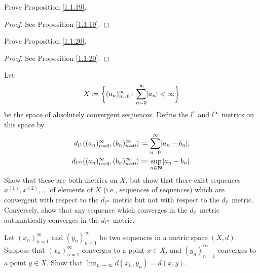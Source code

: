 \begin{exercise}\label{ex 1.1.13}
    Prove Proposition \ref{1.1.19}.
\end{exercise}

\begin{proof}
    See Proposition \ref{1.1.19}.
\end{proof}

\begin{exercise}\label{ex 1.1.14}
    Prove Proposition \ref{1.1.20}.
\end{exercise}

\begin{proof}
    See Proposition \ref{1.1.20}.
\end{proof}

\begin{exercise}\label{ex 1.1.15}
    Let
    \[
        X \coloneqq \bigg\{(a_n)_{n = 0}^\infty : \sum_{n = 0}^\infty \abs*{a_n} < \infty\bigg\}
    \]
    be the space of absolutely convergent sequences. Define the \(l^1\) and \(l^\infty\) metrics
    on this space by
    \begin{align*}
        d_{l^1}((a_n)_{n = 0}^\infty, (b_n)_{n = 0}^\infty)      & \coloneqq \sum_{n = 0}^\infty \abs*{a_n - b_n};     \\
        d_{l^\infty}((a_n)_{n = 0}^\infty, (b_n)_{n = 0}^\infty) & \coloneqq \sup_{n \in \mathbf{N}} \abs*{a_n - b_n}.
    \end{align*}
    Show that these are both metrics on \(X\), but show that there exist sequences \(x^{(1)}, x^{(2)}, \dots\) of elements of \(X\) (i.e., sequences of sequences) which are convergent with respect to the \(d_{l^\infty}\) metric but not with respect to the \(d_{l^1}\) metric.
    Conversely, show that any sequence which converges in the \(d_{l^1}\) metric automatically converges in the \(d_{l^\infty}\) metric.
\end{exercise}

\begin{exercise}\label{ex 1.1.16}
    Let \((x_n)_{n = 1}^\infty\) and \((y_n)_{n = 1}^\infty\) be two sequences in a metric space \((X, d)\).
    Suppose that \((x_n)_{n = 1}^\infty\) converges to a point \(x \in X\), and \((y_n)_{n = 1}^\infty\) converges to a point \(y \in X\).
    Show that \(\lim_{n \to \infty} d(x_n, y_n) = d(x, y)\).
\end{exercise}